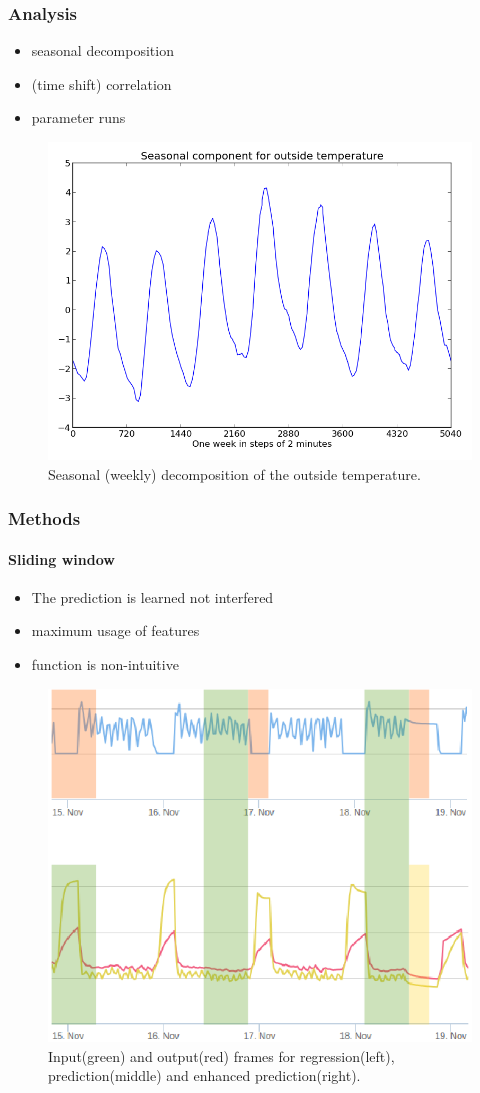 \documentclass{beamer}
\begin{document}
\begin{frame}
\frametitle{Analysis}

\begin{itemize}
\item seasonal decomposition
\item (time shift) correlation 
\item parameter runs
\end{itemize}

\begin{figure}[H]
  \center
  \includegraphics[width=0.6\linewidth]{img/season-outside_temperature.png}
  \caption{Seasonal (weekly) decomposition of the outside temperature.}
  \label{fig:correlation}
\end{figure}
\end{frame}

\begin{frame}
\frametitle{Methods}
\framesubtitle{Sliding window}

\begin{itemize}
\item The prediction is learned not interfered
\item maximum usage of features
\item function is non-intuitive
\end{itemize}

\begin{figure}[H]
  \center
  \includegraphics[width=0.5\linewidth]{img/regpred.png}
  \caption{Input(green) and output(red) frames for regression(left), prediction(middle) and enhanced prediction(right).}
  \label{fig:correlation}
\end{figure}
\end{frame}
\end{document}
